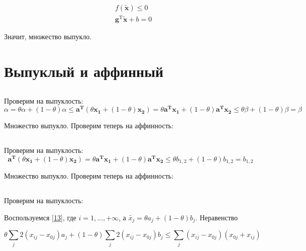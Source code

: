 	
	\begin{equation}
	\begin{split}
	&f(\mathbf{\tilde{x}}) \leqslant 0\\
	&\mathbf{g}^\text{T} \mathbf{\tilde{x}} + b =0
	\end{split}
	\end{equation}
	
	Значит, множество выпукло.
	
	\section{Выпуклый и аффинный}
	
	\subsection{}
	
	Проверим на выпуклость:
	\begin{equation}
	\alpha = \theta \alpha + (1 - \theta) \alpha \leqslant \mathbf{a^T} (\theta
	\mathbf{x_1} + (1 - \theta) \mathbf{x_2}) = \theta \mathbf{a^T} \mathbf{x_1} +
	(1 - \theta) \mathbf{a^T} \mathbf{x_2} \leqslant  \theta \beta + (1 - \theta)
	\beta = \beta 
	\end{equation}
	
	Множество выпукло. Проверим теперь на аффинность:
	
	\subsection{}
	
	Проверим на выпуклость:
	\begin{equation}
	\mathbf{a^T} (\theta \mathbf{x_1} + (1 - \theta) \mathbf{x_2}) = \theta
	\mathbf{a^T} \mathbf{x_1} + (1 - \theta) \mathbf{a^T} \mathbf{x_2} \leqslant 
	\theta b_{1,2} + (1 - \theta) b_{1,2} = b_{1,2}
	\end{equation}
	
	Множество выпукло. Проверим теперь на аффинность:
	
	\subsection{}
	
	Проверим на выпуклость:
	
	Воспользуемся \eqref{13}, где $i=1,...,+\infty$, а $\tilde{x_j} = \theta a_j + (1-\theta) b_j$. Неравенство
	
	\begin{equation}
	\theta\sum_j 2(x_{ij}-x_{0j}) a_j + (1-\theta) \sum_j 2(x_{ij}-x_{0j}) b_j \leqslant \sum_j (x_{ij}-x_{0j}) (x_{0j}+x_{ij}) 
	\end{equation}
	
